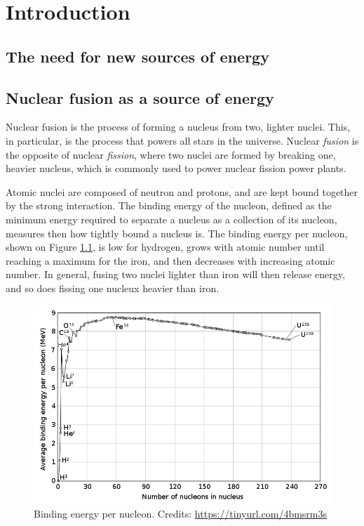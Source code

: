 \documentclass[my_thesis.tex]{subfiles}
\begin{document}
\cleardoublepage
\chapter{Introduction}

\section{The need for new sources of energy}



\section{Nuclear fusion as a source of energy}
Nuclear fusion is the process of forming a nucleus from two, lighter nuclei. This, in particular, is the process that powers all stars in the universe. Nuclear \emph{fusion} is the opposite of nuclear \emph{fission}, where two nuclei are formed by breaking one, heavier nucleus, which is commonly used to power nuclear fission power plants.

Atomic nuclei are composed of neutron and protons, and are kept bound together by the strong interaction. The binding energy of the nucleon, defined as the minimum energy required to separate a nucleus as a collection of its nucleon, measures then how tightly bound a nucleus is. The binding energy per nucleon, shown on Figure \ref{fig. binding energy}, is low for hydrogen, grows with atomic number until reaching a maximum for the iron, and then decreases with increasing atomic number. In general, fusing two nuclei lighter than iron will then release energy, and so does fissing one nucleux heavier than iron.

\begin{figure}
    \centering
    \includegraphics[width=.75\linewidth]{images/Introduction/BindingEnergy.png}
    \caption{Binding energy per nucleon. Credits: \url{https://tinyurl.com/4bmsrm3s}}
    \label{fig. binding energy}
\end{figure}
\end{document}

